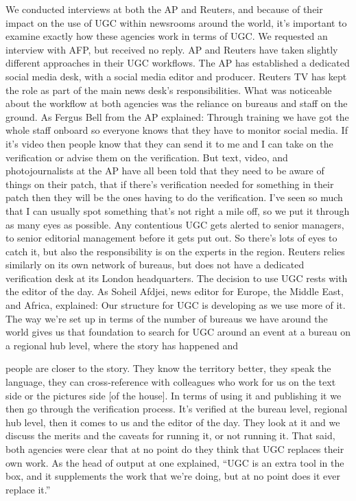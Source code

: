 \begin{enumerate}
We conducted interviews at both the AP and Reuters, and because of their
impact on the use of UGC within newsrooms around the world, it's important
to examine exactly how these agencies work in terms of UGC. We
requested an interview with AFP, but received no reply.
AP and Reuters have taken slightly different approaches in their UGC workflows.
The AP has established a dedicated social media desk, with a social
media editor and producer. Reuters TV has kept the role as part of the main
news desk's responsibilities. What was noticeable about the workflow at
both agencies was the reliance on bureaus and staff on the ground. As Fergus
Bell from the AP explained:
Through training we have got the whole staff onboard so everyone
knows that they have to monitor social media. If it's video then people
know that they can send it to me and I can take on the verification
or advise them on the verification. But text, video, and photojournalists
at the AP have all been told that they need to be aware of things
on their patch, that if there's verification needed for something in
their patch then they will be the ones having to do the verification.
I've seen so much that I can usually spot something that's not right a
mile off, so we put it through as many eyes as possible. Any contentious
UGC gets alerted to senior managers, to senior editorial management
before it gets put out. So there's lots of eyes to catch it, but
also the responsibility is on the experts in the region.
Reuters relies similarly on its own network of bureaus, but does not have
a dedicated verification desk at its London headquarters. The decision to
use UGC rests with the editor of the day. As Soheil Afdjei, news editor for
Europe, the Middle East, and Africa, explained:
Our structure for UGC is developing as we use more of it. The way
we're set up in terms of the number of bureaus we have around the
world gives us that foundation to search for UGC around an event at
a bureau on a regional hub level, where the story has happened and

people are closer to the story. They know the territory better, they
speak the language, they can cross-reference with colleagues who
work for us on the text side or the pictures side [of the house]. In
terms of using it and publishing it we then go through the verification
process. It's verified at the bureau level, regional hub level, then
it comes to us and the editor of the day. They look at it and we discuss
the merits and the caveats for running it, or not running it.
That said, both agencies were clear that at no point do they think that UGC
replaces their own work. As the head of output at one explained, ``UGC is
an extra tool in the box, and it supplements the work that we're doing, but
at no point does it ever replace it.''

\end{enumerate}
